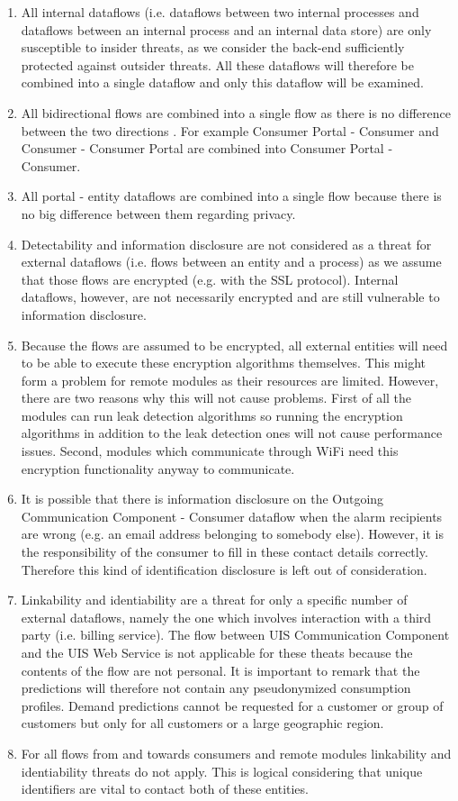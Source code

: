 \begin{enumerate}
  \item All internal dataflows (i.e. dataflows between two internal processes
  and dataflows between an internal process and an internal data store) are only
  susceptible to insider threats, as we consider the back-end sufficiently
  protected against outsider threats. All these dataflows will therefore be
  combined into a single dataflow and only this dataflow will be examined.
  \item All bidirectional flows are combined into a single flow as there is no
  difference between the two directions . For example Consumer Portal - Consumer
  and Consumer - Consumer Portal are combined into Consumer Portal - Consumer.
  \item All portal - entity dataflows are combined into a single flow because
  there is no big difference between them regarding privacy.
  \item Detectability and information disclosure are not considered as a threat
  for external dataflows (i.e. flows between an entity and a process) as we
  assume that those flows are encrypted (e.g. with the SSL protocol). Internal
  dataflows, however, are not necessarily encrypted and are still vulnerable to
  information disclosure.
  \item Because the flows are assumed to be encrypted, all external entities
  will need to be able to execute these encryption algorithms themselves. This
  might form a problem for remote modules as their resources are limited.
  However, there are two reasons why this will not cause problems. First of all
  the modules can run leak detection algorithms so running the encryption
  algorithms in addition to the leak detection ones will not cause performance
  issues. Second, modules which communicate through WiFi need this encryption
  functionality anyway to communicate.
  \item It is possible that there is information disclosure on the Outgoing
  Communication Component - Consumer dataflow when the alarm recipients are
  wrong (e.g. an email address belonging to somebody else). However, it is the
  responsibility of the consumer to fill in these contact details correctly.
  Therefore this kind of identification disclosure is left out of
  consideration.
  \item Linkability and identiability are a threat for only a specific
  number of external dataflows, namely the one which involves interaction with a
  third party (i.e. billing service). The flow between UIS Communication
  Component and the UIS Web Service is not applicable for these theats
  because the contents of the flow are not personal. It is important to remark
  that the predictions will therefore not contain any pseudonymized consumption
  profiles. Demand predictions cannot be requested for a customer or group of
  customers but only for all customers or a large geographic region.  
  \item For all flows from and towards consumers and remote modules linkability
  and identiability threats do not apply. This is logical considering that
  unique identifiers are vital to contact both of these entities.


\end{enumerate}
